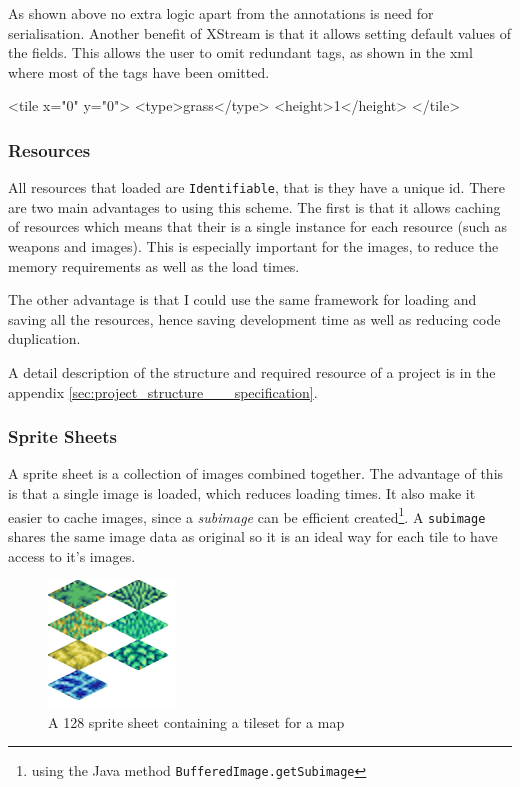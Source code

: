 As shown above no extra logic apart from the annotations is need for serialisation.  Another benefit of XStream is that it allows setting default values of the fields. This allows the user to omit redundant tags, as shown in the xml where most of the tags have been omitted.
\begin{lst:tile}[caption=Serialised form of the above class. ]
<tile x="0" y="0">
	<type>grass</type>
	<height>1</height>
</tile>
\end{lst:tile}


\subsubsection{Resources}

All resources that loaded are \texttt{Identifiable}, that is they have a unique id.  There are two main advantages to using this scheme. The first is that it allows caching of resources which means that their is a single instance for each resource (such as weapons and images). This is especially important for the images, to reduce the memory requirements as well as the load times.

The other advantage is that I could use the same framework for loading and saving all the resources, hence saving development time as well as reducing code duplication. 

A detail description of the structure and  required resource of a project is in the appendix \ref{sec:project_structure___specification}.

\subsubsection{Sprite Sheets}
\label{ssub:sprite_sheets}


A sprite sheet is a collection of images combined together. The advantage of this is that a single image is loaded, which reduces loading times. It also make it easier to cache images, since a \emph{subimage} can be efficient created\footnote{using the Java method \texttt{BufferedImage.getSubimage}}. A \texttt{subimage} shares the same image data as original so it is an ideal way for each tile to have access to it's images\cite{bufferedImage}.    

\begin{figure}[htbp]
	\centering
		\includegraphics{figures/tileset.png}
	\caption{A 128 sprite sheet containing a tileset for a map}
	\label{fig:figures_tileset}
\end{figure}

